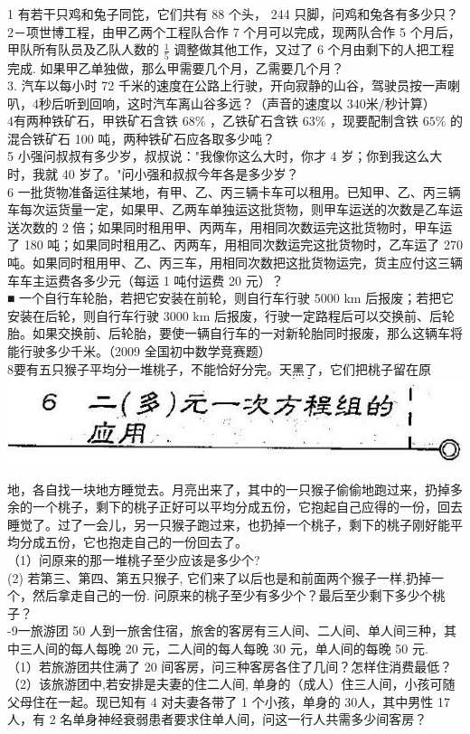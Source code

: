 \documentclass[10pt]{article}
\begin{document}
1 有若干只鸡和兔子同笓，它们共有 88 个头， 244 只脚，问鸡和兔各有多少只？\\
2－项世博工程，由甲乙两个工程队合作 7 个月可以完成，现两队合作 5 个月后，甲队所有队员及乙队人数的 $\frac{1}{5}$ 调整做其他工作，又过了 6 个月由剩下的人把工程完成. 如果甲乙单独做，那么甲需要几个月，乙需要几个月？\\
3. 汽车以每小时 72 千米的速度在公路上行驶，开向寂静的山谷，驾驶员按一声喇叭，4秒后听到回响，这时汽车离山谷多远？（声音的速度以 340米/秒计算）\\
4有两种铁矿石，甲铁矿石含铁 $68 \%$ ，乙铁矿石含铁 $63 \%$ ，现要配制含铁 $65 \%$ 的混合铁矿石 100 吨，两种铁矿石应各取多少吨？\\
5 小强问叔叔有多少岁，叔叔说："我像你这么大时，你才 4 岁；你到我这么大时，我就 40 岁了。"问小强和叔叔今年各是多少岁？\\
6 一批货物准备运往某地，有甲、乙、丙三辆卡车可以租用。已知甲、乙、丙三辆车每次运货量一定，如果甲、乙两车单独运这批货物，则甲车运送的次数是乙车运送次数的 2 倍；如果同时租用甲、丙两车，用相同次数运完这批货物时，甲车运了 180 吨；如果同时租用乙、丙两车，用相同次数运完这批货物时，乙车运了 270 吨。如果同时租用甲、乙、丙三车，用相同次数把这批货物运完，货主应付这三辆车车主运费各多少元（每运 1 吨付运费 20 元）？\\
■ 一个自行车轮胎，若把它安装在前轮，则自行车行驶 5000 km 后报废；若把它安装在后轮，则自行车行驶 3000 km 后报废，行驶一定路程后可以交换前、后轮胎。如果交换前、后轮胎，要使一辆自行车的一对新轮胎同时报废，那么这辆车将能行驶多少千米。（2009 全国初中数学竞赛题）\\
8要有五只猴子平均分一堆桃子，不能恰好分完。天黑了，它们把桃子留在原\\
\includegraphics[max width=\textwidth, center]{2024_10_30_26b590fd1106d28139f0g-039(1)}

地，各自找一块地方睡觉去。月亮出来了，其中的一只猴子偷偷地跑过来，扔掉多余的一个桃子，剩下的桃子正好可以平均分成五份，它抱起自己应得的一份，回去睡觉了。过了一会儿，另一只猴子跑过来，也扔掉一个桃子，剩下的桃子刚好能平均分成五份，它也抱走自己的一份回去了。\\
（1）问原来的那一堆桃子至少应该是多少个?\\
(2) 若第三、第四、第五只猴子, 它们来了以后也是和前面两个猴子一样,扔掉一个，然后拿走自己的一份. 问原来的桃子至少有多少个？最后至少剩下多少个桃子？\\
-9一旅游团 50 人到一旅舍住宿，旅舍的客房有三人间、二人间、单人间三种，其中三人间的每人每晚 20 元，二人间的每人每晚 30 元，单人间的每晚 50 元.\\
（1）若旅游团共住满了 20 间客房，问三种客房各住了几间？怎样住消费最低？\\
（2）该旅游团中,若安排是夫妻的住二人间, 单身的（成人）住三人间，小孩可随父母住在一起。现已知有 4 对夫妻各带了 1 个小孩，单身的 30人，其中男性 17 人，有 2 名单身神经衰弱患者要求住单人间，问这一行人共需多少间客房？
\end{document}
